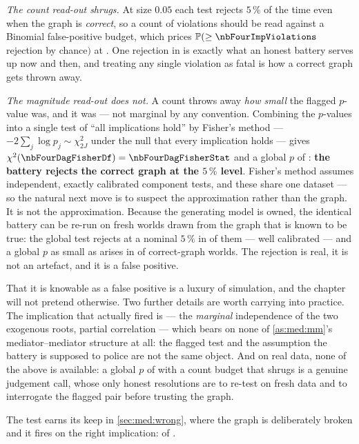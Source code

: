 \emph{The count read-out shrugs.} At size $0.05$ each test rejects $5\,\%$ of the time even when the
graph is \emph{correct}, so a count of violations should be read against a Binomial false-positive
budget, which prices $\Prob(\ge \nbFourImpViolations$ rejection by chance$)$ at \nbFourImpPchance.
One rejection in \nbFourImpTests{} is exactly what an honest battery serves up now and then, and
treating any single violation as fatal is how a correct graph gets thrown away.

\emph{The magnitude read-out does not.} A count throws away \emph{how small} the flagged $p$-value
was, and it was \nbFourImpPFlagged{} --- not marginal by any convention. Combining the
\nbFourImpTests{} $p$-values into a single test of ``all implications hold'' by Fisher's method ---
$-2\sum_j \log p_j \sim \chi^2_{2J}$ under the null that every implication holds --- gives
$\chi^2(\nbFourDagFisherDf) = \nbFourDagFisherStat$ and a global $p$ of \nbFourDagFisherP:
\textbf{the battery rejects the correct graph at the $5\,\%$ level}. Fisher's method assumes
independent, exactly calibrated component tests,
and these share one dataset --- so the natural next move is to suspect the approximation rather than
the graph. It is not the approximation. Because the generating model is owned, the identical battery
can be re-run on \nbFourDagCalWorlds{} fresh worlds drawn from the graph that is known to be true:
the global test rejects at a nominal $5\,\%$ in \pc{\nbFourDagCalRej} of them --- well calibrated ---
and a global $p$ as small as \nbFourDagFisherP{} arises in \pc{\nbFourDagCalP} of correct-graph
worlds. The rejection is real, it is not an artefact, and it is a false positive.

That it is knowable as a false positive is a luxury of simulation, and the chapter will not pretend
otherwise. Two further details are worth carrying into practice. The implication that actually fired
is \nbFourImpFlaggedPair{} --- the \emph{marginal} independence of the two exogenous roots, partial
correlation \nbFourImpFlaggedCorr{} --- which bears on none of \cref{as:med:mm}'s mediator--mediator
structure at all: the flagged test and the assumption the battery is supposed to police are not the
same object. And on real data, none of the above is available: a global $p$ of \nbFourDagFisherP{}
with a count budget that shrugs is a genuine judgement call, whose only honest resolutions are to
re-test on fresh data and to interrogate the flagged pair before trusting the graph.

The test earns its keep in \cref{sec:med:wrong}, where the graph is deliberately broken and it fires
on the right implication: \nbFourBadImpViolations{} of \nbFourBadImpTests.

